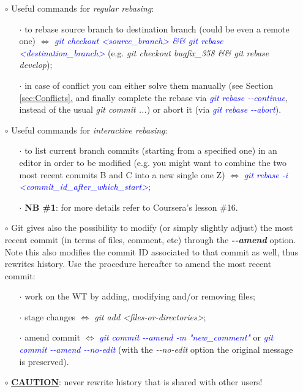 \documentclass[a4paper,portrait,10pt]{article}   %
\newcommand{\mydiv}{$\Leftrightarrow$ }   %
\newcommand{\mysapo}[1]{\textquotesingle #1\textquotesingle }   %
\newcommand{\mycmd}[1]{\textcolor{blue}{\textit{#1}}}   %
\newcommand{\myvspace}{\vspace{4mm}}   %
\newcommand{\mysecref}[1]{\hyperref[#1]{\ref{#1}.}}   %
\begin{document}
\begin{itemize}
\item[$\circ$] Useful commands for \textit{regular rebasing}:
\begin{itemize}
  \item[$\cdot$] to rebase source branch to destination branch (could be even a remote one) \mydiv \mycmd{git checkout <source\_branch> \&\& git rebase <destination\_branch>} (e.g. \textit{git checkout bugfix\_358 \&\& git rebase develop});
  \item[$\cdot$] in case of conflict you can either solve them manually (see Section \mysecref{sec:Conflicts} and finally complete the rebase via \mycmd{git rebase -{}-continue}, instead of the usual \textit{git commit ...}) or abort it (via \mycmd{git rebase -{}-abort}).
\end{itemize}
\myvspace

\item[$\circ$] Useful commands for \textit{interactive rebasing}:
\begin{itemize}
  \item[$\cdot$] to list current branch commits (starting from a specified one) in an editor in order to be modified (e.g. you might want to combine the two most recent commits \mysapo{B} and \mysapo{C} into a new single one \mysapo{Z}) \mydiv \mycmd{git rebase -i <commit\_id\_after\_which\_start>};
  \item[$\cdot$] \textbf{NB \#1}: for more details refer to Coursera's lesson \#16.
\end{itemize}
\myvspace

\item[$\circ$] Git gives also the possibility to modify (or simply slightly adjust) the most recent commit (in terms of files, comment, etc) through the \textbf{\textit{-{}-amend}} option. Note this also modifies the commit ID associated to that commit as well, thus rewrites history. Use the procedure hereafter to amend the most recent commit:
\begin{itemize}
  \item[$\cdot$] work on the WT by adding, modifying and/or removing files;
  \item[$\cdot$] stage changes \mydiv \textit{git add <files-or-directories>};
  \item[$\cdot$] amend commit \mydiv \mycmd{git commit -{}-amend -m "new\_comment"} or \mycmd{git commit -{}-amend -{}-no-edit} (with the \textit{-{}-no-edit} option the original message is preserved).
\end{itemize}
\myvspace

\item[$\circ$] \textbf{\underline{CAUTION}}: never rewrite history that is shared with other users!
\end{itemize}
\myvspace
\end{document}

